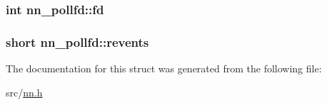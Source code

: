 \subsubsection[{fd}]{\setlength{\rightskip}{0pt plus 5cm}int nn\+\_\+pollfd\+::fd}\hypertarget{structnn__pollfd_a6f8872e0d7e690a62592e2ffaa1b912a}{}\label{structnn__pollfd_a6f8872e0d7e690a62592e2ffaa1b912a}
\subsubsection[{revents}]{\setlength{\rightskip}{0pt plus 5cm}short nn\+\_\+pollfd\+::revents}\hypertarget{structnn__pollfd_aee92d25ebcaf6dbb0030537a75ddc7a1}{}\label{structnn__pollfd_aee92d25ebcaf6dbb0030537a75ddc7a1}


The documentation for this struct was generated from the following file\+:\begin{DoxyCompactItemize}
\item 
src/\hyperlink{nn_8h}{nn.\+h}\end{DoxyCompactItemize}
